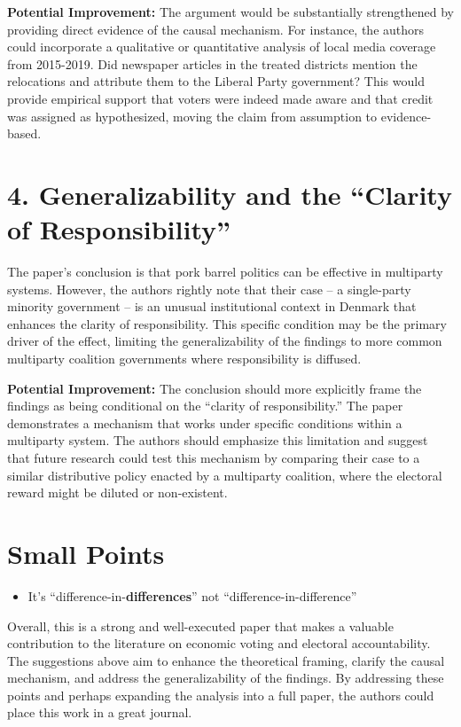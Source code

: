 \documentclass[
  letterpaper,
  DIV=11,
  numbers=noendperiod]{scrartcl}
\providecommand{\tightlist}{%
  \setlength{\itemsep}{0pt}\setlength{\parskip}{0pt}}\usepackage{longtable,booktabs,array}
\begin{document}
\textbf{Potential Improvement:} The argument would be substantially
strengthened by providing direct evidence of the causal mechanism. For
instance, the authors could incorporate a qualitative or quantitative
analysis of local media coverage from 2015-2019. Did newspaper articles
in the treated districts mention the relocations and attribute them to
the Liberal Party government? This would provide empirical support that
voters were indeed made aware and that credit was assigned as
hypothesized, moving the claim from assumption to evidence-based.

\section{4. Generalizability and the ``Clarity of
Responsibility''}\label{generalizability-and-the-clarity-of-responsibility}

The paper's conclusion is that pork barrel politics can be effective in
multiparty systems. However, the authors rightly note that their case --
a single-party minority government -- is an unusual institutional
context in Denmark that enhances the clarity of responsibility. This
specific condition may be the primary driver of the effect, limiting the
generalizability of the findings to more common multiparty coalition
governments where responsibility is diffused.

\textbf{Potential Improvement:} The conclusion should more explicitly
frame the findings as being conditional on the ``clarity of
responsibility.'' The paper demonstrates a mechanism that works under
specific conditions within a multiparty system. The authors should
emphasize this limitation and suggest that future research could test
this mechanism by comparing their case to a similar distributive policy
enacted by a multiparty coalition, where the electoral reward might be
diluted or non-existent.

\section{Small Points}\label{small-points}

\begin{itemize}
\tightlist
\item
  It's ``difference-in-\textbf{differences}'' not
  ``difference-in-difference''
\end{itemize}

Overall, this is a strong and well-executed paper that makes a valuable
contribution to the literature on economic voting and electoral
accountability. The suggestions above aim to enhance the theoretical
framing, clarify the causal mechanism, and address the generalizability
of the findings. By addressing these points and perhaps expanding the
analysis into a full paper, the authors could place this work in a great
journal.
\end{document}
